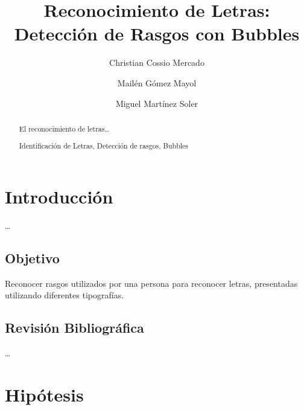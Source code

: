 \documentclass[runningheads,a4paper]{llncs}
\newcommand{\keywords}[1]{\par\addvspace\baselineskip
\noindent\keywordname\enspace\ignorespaces#1}
\begin{document}
\mainmatter

\title{Reconocimiento de Letras:\\ Detecci\'on de Rasgos con Bubbles}
\author{Christian Cossio Mercado \and Mail\'en G\'omez Mayol \and Miguel Mart\'inez Soler}


\maketitle
\begin{abstract}
El reconocimiento de letras\ldots
\keywords{Identificaci\'on de Letras, Detecci\'on de rasgos, Bubbles}
\end{abstract}


\section{Introducción}
\label{sec:Introduccion}
\ldots

\subsection{Objetivo}
Reconocer rasgos utilizados por una persona para reconocer letras, presentadas utilizando diferentes tipografías.

\subsection{Revisi\'on Bibliográfica}
\label{sec:RevisionBibliografica}
\ldots


\section{Hipótesis}
\end{document}
